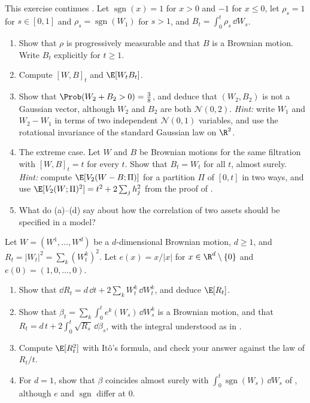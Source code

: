 \begin{exercise}\label{ex:itf-not-gaussian}
\medium This exercise continues . Let $\operatorname{sgn}(x)=1$ for $x>0$ and $-1$ for $x\le0$, let $\rho_s=1$ for $s\in[0,1]$ and
$\rho_s=\operatorname{sgn}(W_1)$ for $s>1$, and $B_t=\int_0^t\rho_s\,\dd W_s$.
\begin{enumerate}[label=(\alph*)]
  \item Show that $\rho$ is progressively measurable and that $B$ is a Brownian motion. Write $B_t$
    explicitly for $t\ge1$.
  \item Compute $[W,B]_t$ and $\E[W_tB_t]$.
  \item Show that $\Prob(W_2+B_2>0)=\frac38$, and deduce that $(W_2,B_2)$ is not a Gaussian vector,
    although $W_2$ and $B_2$ are both $\mathcal N(0,2)$. \emph{Hint:} write $W_1$ and $W_2-W_1$ in
    terms of two independent $\mathcal N(0,1)$ variables, and use the rotational invariance of the
    standard Gaussian law on $\R^2$.
  \item The extreme case. Let $W$ and $B$ be Brownian motions for the same filtration with
    $[W,B]_t=t$ for every $t$. Show that $B_t=W_t$ for all $t$, almost surely. \emph{Hint:} compute
    $\E[V_2(W-B;\Pi)]$ for a partition $\Pi$ of $[0,t]$ in two ways, and use
    $\E[V_2(W;\Pi)^2]=t^2+2\sum_jh_j^2$ from the proof of .
  \item What do (a)--(d) say about how the correlation of two assets should be specified in a model?
\end{enumerate}
\end{exercise}

\begin{exercise}\label{ex:itf-bessel}
\medium Let $W=(W^1,\dots,W^d)$ be a $d$-dimensional Brownian motion, $d\ge1$, and
$R_t=|W_t|^2=\sum_k(W^k_t)^2$. Let $e(x)=x/|x|$ for $x\in\R^d\setminus\{0\}$ and $e(0)=(1,0,\dots,0)$.
\begin{enumerate}[label=(\alph*)]
  \item Show that $\dd R_t=d\,\dd t+2\sum_kW^k_t\,\dd W^k_t$, and deduce $\E[R_t]$.
  \item Show that $\beta_t=\sum_k\int_0^te^k(W_s)\,\dd W^k_s$ is a Brownian motion, and that
    $R_t=d\,t+2\int_0^t\sqrt{R_s}\,\dd\beta_s$, with the integral understood as in
    .
  \item Compute $\E[R_t^2]$ with It\^o's formula, and check your answer against the law of $R_t/t$.
  \item For $d=1$, show that $\beta$ coincides almost surely with $\int_0^t\operatorname{sgn}(W_s)\,\dd W_s$
    of , although $e$ and $\operatorname{sgn}$ differ at $0$.
\end{enumerate}
\end{exercise}

